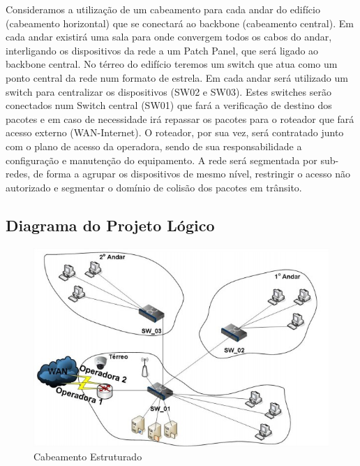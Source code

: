 \documentclass[	DIV=calc,%
							paper=a4,%
							fontsize=12pt,%
							onecolumn]{scrartcl}	 					%
\begin{document}
{\raggedright Consideramos a utilização de um cabeamento para cada andar do edifício (cabeamento
horizontal) que se conectará ao backbone (cabeamento central). Em cada andar existirá uma sala
para onde convergem todos os cabos do andar, interligando os dispositivos da rede a um Patch
Panel, que será ligado ao backbone central. No térreo do edifício teremos um switch que atua
como um ponto central da rede num formato de estrela.
Em cada andar será utilizado um switch para centralizar os dispositivos (SW02 e SW03).
Estes switches serão conectados num Switch central (SW01) que fará a verificação de destino
dos pacotes e em caso de necessidade irá repassar os pacotes para o roteador que fará acesso
externo (WAN-Internet). O roteador, por sua vez, será contratado junto com o plano de acesso da
operadora, sendo de sua responsabilidade a configuração e manutenção do equipamento.
A rede será segmentada por sub-redes, de forma a agrupar os dispositivos de mesmo nível,
restringir o acesso não autorizado e segmentar o domínio de colisão dos pacotes em trânsito.
}
\subsection{Diagrama do Projeto Lógico}
\begin{figure}[H]
  \centering
  \includegraphics[width=\textwidth]{projeto_logico} 
  \caption{Cabeamento Estruturado}
  \label{fig:methodology}
\end{figure}
\end{document}
